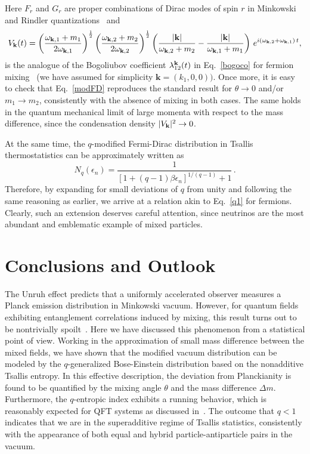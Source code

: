 \documentclass[floats,prd,aps,amssymb,nofootinbib,showkeys]{revtex4}
\newcommand{\be}{\begin{equation}}\newcommand{\ee}{\end{equation}}
\def\bogvb{{\lambda}_{\bk}}
\def\bogvb{{\lambda}^{\bf{k}}_{12}}
\begin{document}
Here $F_r$ and $G_r$ are proper combinations
of Dirac modes of spin $r$ in Minkowski and Rindler quantizations~\cite{NonTN}
and 
\be
V_\bk(t)=\left(\frac{\omega_{{\bf k},1}+m_{1}}{2\omega_{{\bf k},1}}\right)^{\frac{1}{2}}
\left(\frac{\omega_{{\bf k},2}+m_{2}}{2\omega_{{\bf k},2}}\right)^{\frac{1}{2}}\left(\frac{|{\bf k} |}{\omega_{{\bf k},2}+m_{2}}-\frac{|{\bf k}|}{\omega_{{\bf k},1}+m_{1}}\right)\,e^{i(\omega_{{\bf k},2}+\omega_{{\bf k},1})\,t},
\label{eqn:Vk2}
\ee
is the analogue of the Bogoliubov coefficient $\bogvb(t)$ in Eq.~\eqref{bogoco}
for fermion mixing~\cite{BV95} (we have assumed for simplicity $\textbf{k}=(k_1,0,0))$. Once more, 
it is easy to check that Eq.~\eqref{modFD} 
reproduces the standard result for $\theta\rightarrow0$
and/or $m_1\rightarrow m_2$, consistently with the absence of mixing in both cases. The same holds in the quantum mechanical 
limit of large momenta with respect to the mass difference, 
since the condensation density $|V_{\bf {k}}|^2\rightarrow0$.


At the same time, the $q$-modified Fermi-Dirac
distribution in Tsallis thermostatistics can be approximately 
written as~\cite{Buyu3}
\be
\label{modFD}
N_q(\epsilon_n)=\frac{1}{\left[1+(q-1)\beta \epsilon_n\right]^{1/(q-1)}+1}\,.
\ee
Therefore, by expanding for small deviations of $q$ from unity
and following the same reasoning as earlier, we arrive
at a relation akin to Eq.~\eqref{q1} for fermions. 
Clearly, such an extension deserves careful attention, 
since neutrinos are the most abundant and emblematic example
of mixed particles. 


\section{Conclusions and Outlook} 
\label{Conc}

The Unruh effect predicts that 
a uniformly accelerated observer 
measures a Planck emission
distribution in Minkowski vacuum. 
However, for quantum fields exhibiting 
entanglement correlations induced by mixing, 
this result turns out to be nontrivially spoilt~\cite{Luciano,NonTN}. 
Here we have discussed this phenomenon 
from a statistical point of view.
Working in the approximation of small mass difference
between the mixed fields, we have shown that 
the modified vacuum distribution 
can be modeled by the $q$-generalized Bose-Einstein
distribution based on the nonadditive Tsallis entropy. In 
this effective description, the deviation from Planckianity 
is found to be quantified by the mixing angle $\theta$ and the mass difference $\Delta m$. Furthermore, 
the $q$-entropic index exhibits 
a running behavior, which is reasonably expected for QFT systems as discussed in~\cite{App13}. The outcome that $q<1$ indicates
that we are in the superadditive regime of Tsallis statistics, 
consistently with the appearance of both equal
and hybrid particle-antiparticle pairs in the vacuum.  
\end{document}
